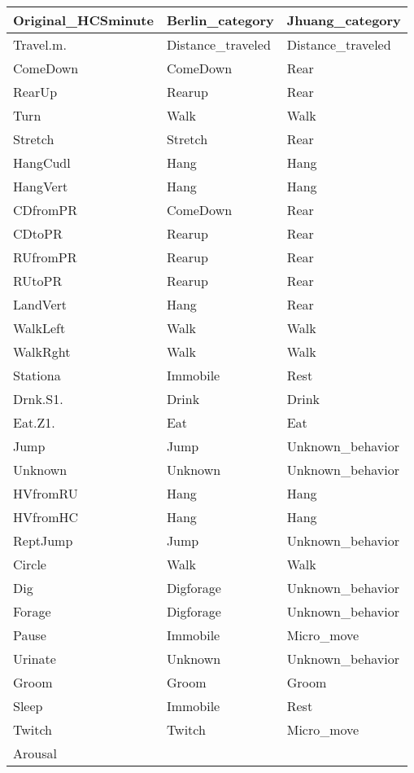 \begin{table}[!htbp]
\centering
\begin{tabular}{|l|l|l|}
  \hline
Original\_HCSminute & Berlin\_category & Jhuang\_category \\ 
  \hline
Travel.m. & Distance\_traveled & Distance\_traveled \\ 
  ComeDown & ComeDown & Rear \\ 
  RearUp & Rearup & Rear \\ 
  Turn & Walk & Walk \\ 
  Stretch & Stretch & Rear \\ 
  HangCudl & Hang & Hang \\ 
  HangVert & Hang & Hang \\ 
  CDfromPR & ComeDown & Rear \\ 
  CDtoPR & Rearup & Rear \\ 
  RUfromPR & Rearup & Rear \\ 
  RUtoPR & Rearup & Rear \\ 
  LandVert & Hang & Rear \\ 
  WalkLeft & Walk & Walk \\ 
  WalkRght & Walk & Walk \\ 
  Stationa & Immobile & Rest \\ 
  Drnk.S1. & Drink & Drink \\ 
  Eat.Z1. & Eat & Eat \\ 
  Jump & Jump & Unknown\_behavior \\ 
  Unknown & Unknown & Unknown\_behavior \\ 
  HVfromRU & Hang & Hang \\ 
  HVfromHC & Hang & Hang \\ 
  ReptJump & Jump & Unknown\_behavior \\ 
  Circle & Walk & Walk \\ 
  Dig & Digforage & Unknown\_behavior \\ 
  Forage & Digforage & Unknown\_behavior \\ 
  Pause & Immobile & Micro\_move \\ 
  Urinate & Unknown & Unknown\_behavior \\ 
  Groom & Groom & Groom \\ 
  Sleep & Immobile & Rest \\ 
  Twitch & Twitch & Micro\_move \\ 
  Arousal &  &  \\ 

\end{tabular}
\end{table}
